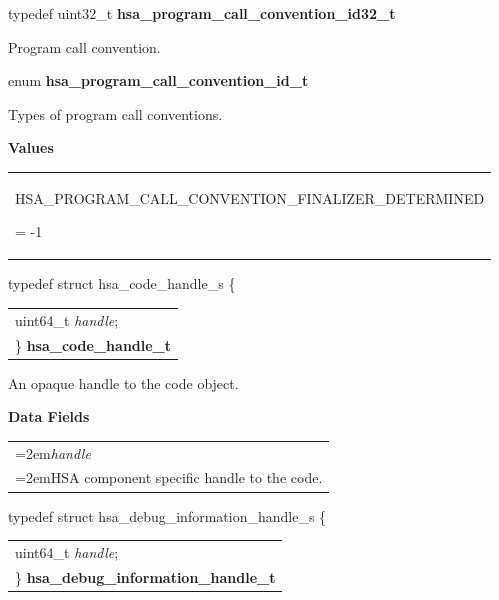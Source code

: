 \documentclass[final]{book}
\newcommand{\reffld}[1]{\textit{#1}}
\newcommand{\reftyp}[1]{#1}
\newcommand{\refenu}[1]{\reftyp{#1}}
\begin{document}
\begin{appendices}
\noindent\begin{tcolorbox}[nobeforeafter,arc=0mm,colframe=white,colback=lightgray,left=0mm]
typedef uint32_t  \hypertarget{group--FinalizerCoreApi-1ga8864426eb7d3278691632007c4eeebeb}{\textbf{hsa_program_call_convention_id32_t}}
\end{tcolorbox}
Program call convention.
\\

\noindent\begin{tcolorbox}[nobeforeafter,arc=0mm,colframe=white,colback=lightgray,left=0mm]
enum \hypertarget{group--FinalizerCoreApi-1ga49be7e7073f900ea0d7b82b4af91efe2}{\textbf{hsa_program_call_convention_id_t}}
\end{tcolorbox}
Types of program call conventions.

\noindent\textbf{Values}\\[-5mm]
\begin{longtable}{@{\hspace{2em}}p{\linewidth-2em}}
\hspace{-2em}\hypertarget{group--FinalizerCoreApi-1gga49be7e7073f900ea0d7b82b4af91efe2a368065ad79f8760f7162fd6416a42f51}{\refenu{HSA_PROGRAM_CALL_CONVENTION_FINALIZER_DETERMINED}} = -1
\end{longtable}

\noindent\begin{tcolorbox}[breakable,nobeforeafter,arc=0mm,colframe=white,colback=lightgray,left=0mm]
typedef struct  hsa_code_handle_s \{
\vspace{-3.5mm}\begin{longtable}{@{}p{\textwidth}}
\hspace{1.7em}uint64_t \reffld{handle};\\
\}  \hypertarget{group--FinalizerCoreApi-1gae2542da5f2c5ae2f21c2f86a594c5309}{\textbf{hsa_code_handle_t}}
\end{longtable}

\end{tcolorbox}
An opaque handle to the code object.

\noindent\textbf{Data Fields}\\[-6mm]
\begin{longtable}{@{}>{\hangindent=2em}p{\textwidth}}
\reffld{handle}\\\hspace{2em}HSA component specific handle to the code.
\end{longtable}



\noindent\begin{tcolorbox}[breakable,nobeforeafter,arc=0mm,colframe=white,colback=lightgray,left=0mm]
typedef struct  hsa_debug_information_handle_s \{
\vspace{-3.5mm}\begin{longtable}{@{}p{\textwidth}}
\hspace{1.7em}uint64_t \reffld{handle};\\
\}  \hypertarget{group--FinalizerCoreApi-1ga94f1f72e9e58c7dca49026526fe95959}{\textbf{hsa_debug_information_handle_t}}
\end{longtable}


\end{tcolorbox}
\end{appendices}
\end{document}
